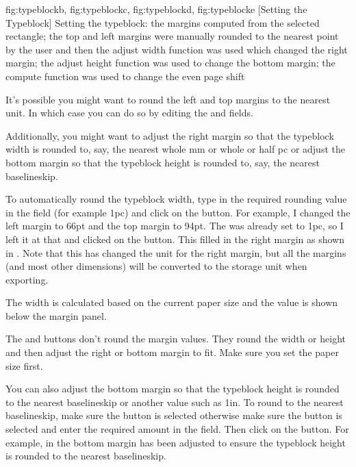 {
  {fig:typeblockb}{}{},
  {fig:typeblockc}{}{},
  {fig:typeblockd}{}{},
  {fig:typeblocke}{}{}
}
[Setting the Typeblock]
{Setting the typeblock:
 the margins computed from the
selected rectangle;
 the top and left margins were
manually rounded to the nearest point by the user and then the
adjust width function was used which changed the right margin;
 the adjust height function was used to change the
bottom margin;
 the compute function was used to
change the even page shift}

It's possible you might want to round the left and top margins to
the nearest unit. In which case you can do so by editing the
 and
 fields.

Additionally, you might want to adjust the right margin so that the
\gls{typeblock} width is rounded to, say, the nearest whole mm or
whole or half \gls{pc} or adjust the bottom margin so that the
\gls{typeblock} height is rounded to, say, the nearest baselineskip.

To automatically round the \gls{typeblock} width, type in the
required rounding value in the 
field (for example 1\gls{pc}) and click on the
 button. For example, I changed the
left margin to 66\gls{pt} and the top margin to 94\gls{pt}. The
 was already set to 1\gls{pc}, so I
left it at that and clicked on the 
button. This filled in the right margin as shown in
. Note that this has changed the unit for
the right margin, but all the margins (and most other dimensions)
will be converted to the storage unit when exporting.

The width is calculated based on the current paper size and the
value is shown below the margin panel.

\begin{important}
The  and 
buttons don't round the margin values. They round the width or
height and then adjust the right or bottom margin to fit. Make sure you set the
paper size first.
\end{important}

You can also adjust the bottom margin so that the \gls{typeblock} height
is rounded to the nearest baselineskip or another value such as 1in.
To round to the nearest baselineskip, make sure the
 button is selected otherwise
make sure the  button is
selected and enter the required amount in the field. Then click on
the  button. For example, in
 the bottom margin has been adjusted to
ensure the \gls{typeblock} height is rounded to the nearest baselineskip.

